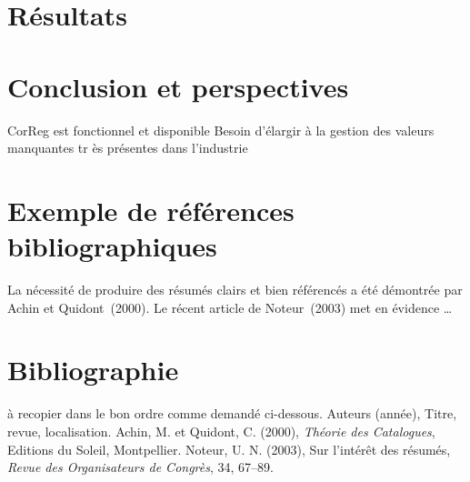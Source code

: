 \documentclass[12pt]{article}
\begin{document}
\section{R\'esultats}	
\section{Conclusion et perspectives}
	CorReg est fonctionnel et disponible
	Besoin d'\'elargir à la gestion des valeurs manquantes tr \`es pr\'esentes dans l'industrie
\section{Exemple de r\'ef\'erences bibliographiques}
La n\'ecessit\'e de produire des r\'esum\'es clairs et bien
r\'ef\'erenc\'es a \'et\'e d\'emontr\'ee par Achin et Quidont~(2000). Le
r\'ecent article de Noteur~(2003) met en \'evidence \dots
\section*{Bibliographie}
\cite{marquardt1975ridge}
{}

à recopier dans le bon ordre comme demand\'e ci-dessous.
\noindent [1] Auteurs (ann\'ee), Titre, revue, localisation.
\noindent [2] Achin, M. et Quidont, C. (2000), {\it Th\'eorie des
Catalogues}, Editions du Soleil, Montpellier.
\noindent [3] Noteur, U. N. (2003), Sur l'int\'er\^et des
r\'esum\'es, {\it Revue des Organisateurs de Congr\`es}, 34, 67--89.
\end{document}
